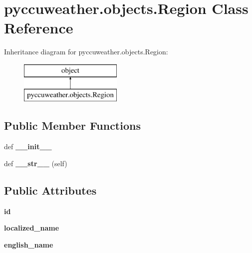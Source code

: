 \hypertarget{classpyccuweather_1_1objects_1_1_region}{}\section{pyccuweather.\+objects.\+Region Class Reference}
\label{classpyccuweather_1_1objects_1_1_region}
Inheritance diagram for pyccuweather.\+objects.\+Region\+:\begin{figure}[H]
\begin{center}
\leavevmode
\includegraphics[height=2.000000cm]{classpyccuweather_1_1objects_1_1_region}
\end{center}
\end{figure}
\subsection*{Public Member Functions}
\begin{DoxyCompactItemize}
\item 
\hypertarget{classpyccuweather_1_1objects_1_1_region_a6e0c994649920851d4b7663c84e925e9}{}def {\bfseries \+\_\+\+\_\+init\+\_\+\+\_\+}\label{classpyccuweather_1_1objects_1_1_region_a6e0c994649920851d4b7663c84e925e9}

\item 
\hypertarget{classpyccuweather_1_1objects_1_1_region_a0288fc9bc476e70a1554bd78c72f9709}{}def {\bfseries \+\_\+\+\_\+str\+\_\+\+\_\+} (self)\label{classpyccuweather_1_1objects_1_1_region_a0288fc9bc476e70a1554bd78c72f9709}

\end{DoxyCompactItemize}
\subsection*{Public Attributes}
\begin{DoxyCompactItemize}
\item 
\hypertarget{classpyccuweather_1_1objects_1_1_region_a8b22e132f3f4f11e45dc53a2e4651b91}{}{\bfseries id}\label{classpyccuweather_1_1objects_1_1_region_a8b22e132f3f4f11e45dc53a2e4651b91}

\item 
\hypertarget{classpyccuweather_1_1objects_1_1_region_a92b68f1cabb88148305003393def659c}{}{\bfseries localized\+\_\+name}\label{classpyccuweather_1_1objects_1_1_region_a92b68f1cabb88148305003393def659c}

\item 
\hypertarget{classpyccuweather_1_1objects_1_1_region_a6fbfd568b12248b7594b721b4546f7b9}{}{\bfseries english\+\_\+name}\label{classpyccuweather_1_1objects_1_1_region_a6fbfd568b12248b7594b721b4546f7b9}

\end{DoxyCompactItemize}


